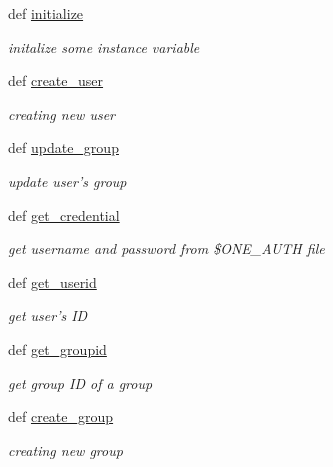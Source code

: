 \begin{DoxyCompactItemize}
\item 
\-d\-e\-f \hyperlink{classSSPCloudAuth_1_1SSP__Helper_a8b1eb81e732507395531e5ecca1ae5ac}{\-i\-n\-i\-t\-i\-a\-l\-i\-z\-e}
\begin{DoxyCompactList}\small\item\em initalize some instance variable \end{DoxyCompactList}\item 
\-d\-e\-f \hyperlink{classSSPCloudAuth_1_1SSP__Helper_aae0706c9b01abd6bd572ab8fd7f922dd}{\-c\-r\-e\-a\-t\-e\_\-\-u\-s\-e\-r}
\begin{DoxyCompactList}\small\item\em creating new user \end{DoxyCompactList}\item 
\-d\-e\-f \hyperlink{classSSPCloudAuth_1_1SSP__Helper_a6ee8d0362b388c9f0e19426c4549e810}{\-u\-p\-d\-a\-t\-e\_\-\-g\-r\-o\-u\-p}
\begin{DoxyCompactList}\small\item\em update user's group \end{DoxyCompactList}\item 
\-d\-e\-f \hyperlink{classSSPCloudAuth_1_1SSP__Helper_add5294945874da903d07f19260dbe6fd}{\-g\-e\-t\_\-\-c\-r\-e\-d\-e\-n\-t\-i\-a\-l}
\begin{DoxyCompactList}\small\item\em get username and password from \$\-O\-N\-E\_\-\-A\-U\-T\-H file \end{DoxyCompactList}\item 
\-d\-e\-f \hyperlink{classSSPCloudAuth_1_1SSP__Helper_a37361a128e2be7b55c827b9acb7ac39d}{\-g\-e\-t\_\-\-u\-s\-e\-r\-i\-d}
\begin{DoxyCompactList}\small\item\em get user's ID \end{DoxyCompactList}\item 
\-d\-e\-f \hyperlink{classSSPCloudAuth_1_1SSP__Helper_a234353a6aef0ec209f66a7fc93561b58}{\-g\-e\-t\_\-\-g\-r\-o\-u\-p\-i\-d}
\begin{DoxyCompactList}\small\item\em get group ID of a group \end{DoxyCompactList}\item 
\-d\-e\-f \hyperlink{classSSPCloudAuth_1_1SSP__Helper_acc00beacf7f1ca3825ad5f4d452c89db}{\-c\-r\-e\-a\-t\-e\_\-\-g\-r\-o\-u\-p}
\begin{DoxyCompactList}\small\item\em creating new group \end{DoxyCompactList}\item 

\end{DoxyCompactItemize}
